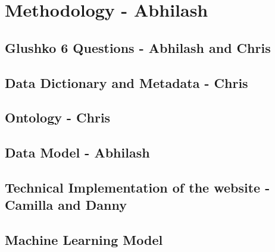 \section {Methodology - Abhilash}

\subsection{Glushko 6 Questions - Abhilash and Chris}

\subsection{Data Dictionary and Metadata - Chris}

\subsection{Ontology - Chris} 

\subsection{Data Model - Abhilash} 

\subsection{Technical Implementation of the website - Camilla and Danny}

\subsection{Machine Learning Model}
